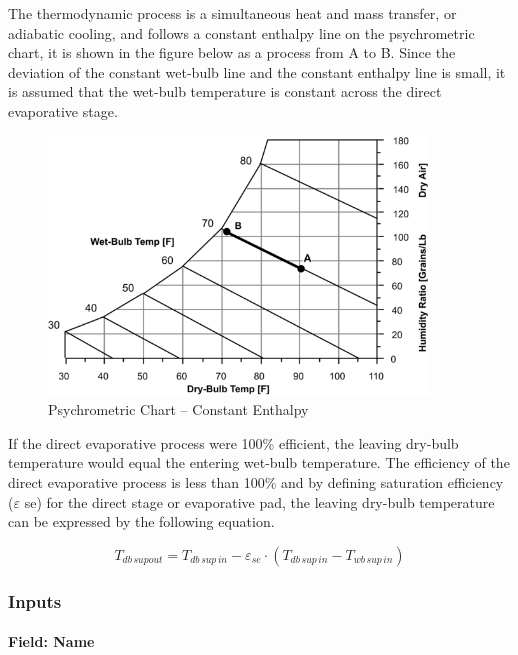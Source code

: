 The thermodynamic process is a simultaneous heat and mass transfer, or adiabatic cooling, and follows a constant enthalpy line on the psychrometric chart, it is shown in the figure below as a process from A to B. Since the deviation of the constant wet-bulb line and the constant enthalpy line is small, it is assumed that the wet-bulb temperature is constant across the direct evaporative stage.

\begin{figure}[hbtp] %
\centering
\includegraphics[width=0.9\textwidth, height=0.9\textheight, keepaspectratio=true]{media/image416.png}
\caption{Psychrometric Chart -- Constant Enthalpy \protect \label{fig:psychrometric-chart-constant-enthalpy}}
\end{figure}

If the direct evaporative process were 100\% efficient, the leaving dry-bulb temperature would equal the entering wet-bulb temperature. The efficiency of the direct evaporative process is less than 100\% and by defining saturation efficiency (\(\varepsilon\) se) for the direct stage or evaporative pad, the leaving dry-bulb temperature can be expressed by the following equation.

\begin{equation}
{T_{db\,supout}} = {T_{db\,sup\,in}} - {\varepsilon_{se}}\cdot \left( {{T_{db\,sup\,in}} - {T_{wb\,sup\,in}}} \right)
\end{equation}

\subsubsection{Inputs}\label{inputs-016}

\paragraph{Field: Name}\label{field-name-015}

